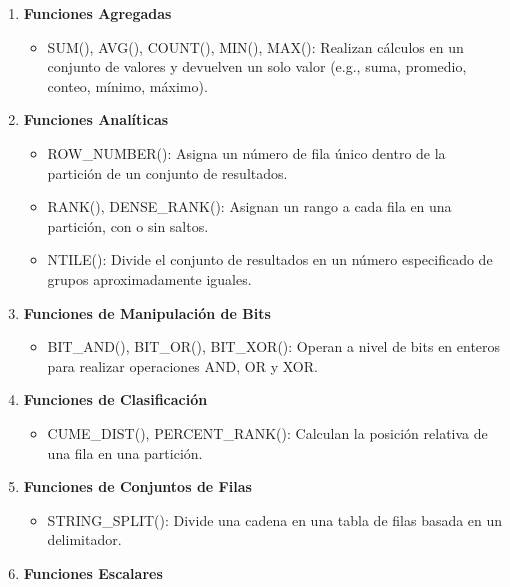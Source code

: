 \documentclass[a4paper,openany,11pt]{article}
\begin{document}
\begin{enumerate}
    \item{\textbf{Funciones Agregadas}}
    \begin{itemize}
        \item SUM(), AVG(), COUNT(), MIN(), MAX(): Realizan cálculos en un
            conjunto de valores y devuelven un solo valor (e.g., suma,
            promedio, conteo, mínimo, máximo).
    \end{itemize}


    \item{\textbf{Funciones Analíticas}}
    \begin{itemize}
        \item ROW\_NUMBER(): Asigna un número de fila único dentro de la
            partición de un conjunto de resultados.
        \item RANK(), DENSE\_RANK(): Asignan un rango a cada fila en una
            partición, con o sin saltos.
        \item NTILE(): Divide el conjunto de resultados en un número
            especificado de grupos aproximadamente iguales.
    \end{itemize}


    \item{\textbf{Funciones de Manipulación de Bits}}
    \begin{itemize}
        \item BIT\_AND(), BIT\_OR(), BIT\_XOR(): Operan a nivel de bits en
            enteros para realizar operaciones AND, OR y XOR.
    \end{itemize}



    \item{\textbf{Funciones de Clasificación}}
    \begin{itemize}
        \item CUME\_DIST(), PERCENT\_RANK(): Calculan la posición relativa de una
            fila en una partición.
    \end{itemize}


    \item{\textbf{Funciones de Conjuntos de Filas}}
    \begin{itemize}
        \item STRING\_SPLIT(): Divide una cadena en una tabla de filas basada en un
            delimitador.
    \end{itemize}

    \item{\textbf{Funciones Escalares}}


\end{enumerate}
\end{document}
